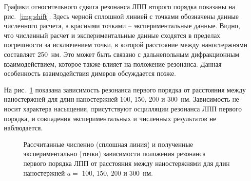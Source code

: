 Графики относительного сдвига резонанса ЛПП второго порядка показаны на рис.~\ref{img:shift}. Здесь черной сплошной линией с точками обозначены данные численного расчета, а красными точками -- экспериментальные данные. Видно, что численный расчет и экспериментальные данные сходятся в пределах погрешности за исключением точки, в которой расстояние между наностержнями составляет 250~нм. Это может быть связано с дальнепольным дифракционным взаимодействием, которое также влияет на положение резонанса. Данная особенность взаимодействия димеров обсуждается позже.

На рис.~\ref{img:1res} показана зависимость резонанса первого порядка от расстояния между наностержней для длин наностержней 100, 150, 200 и 300~нм. Зависимость не носит характера насыщения, присутствуют осцилляции резонанса ЛПП первого порядка, и совпадения экспериментальных и численных результатов не наблюдается.
\begin{figure}[t]
\caption{Рассчитанные численно (сплошная линия) и полученные экспериментально (точки) зависимости положения резонанса первого порядка ЛПП от расстояния между наностержнями для длин наностержней $ a = $ 100, 150, 200 и 300~нм.}
\label{img:1res}
\end{figure}

